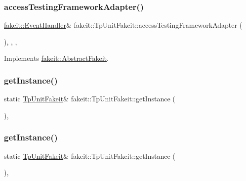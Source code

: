 \subsubsection{\texorpdfstring{accessTestingFrameworkAdapter()}{accessTestingFrameworkAdapter()}\hspace{0.1cm}{\footnotesize\ttfamily [2/2]}}
{\footnotesize\ttfamily \mbox{\hyperlink{structfakeit_1_1EventHandler}{fakeit\+::\+Event\+Handler}}\& fakeit\+::\+Tp\+Unit\+Fakeit\+::access\+Testing\+Framework\+Adapter (\begin{DoxyParamCaption}{ }\end{DoxyParamCaption})\hspace{0.3cm}{\ttfamily [inline]}, {\ttfamily [override]}, {\ttfamily [protected]}, {\ttfamily [virtual]}}



Implements \mbox{\hyperlink{classfakeit_1_1AbstractFakeit_a9476180a503524d49d1978fbbc125b01}{fakeit\+::\+Abstract\+Fakeit}}.

\mbox{\label{classfakeit_1_1TpUnitFakeit_ae92881b2c1b37f04ed19bc3a95e4514f}} 
\subsubsection{\texorpdfstring{getInstance()}{getInstance()}\hspace{0.1cm}{\footnotesize\ttfamily [1/2]}}
{\footnotesize\ttfamily static \mbox{\hyperlink{classfakeit_1_1TpUnitFakeit}{Tp\+Unit\+Fakeit}}\& fakeit\+::\+Tp\+Unit\+Fakeit\+::get\+Instance (\begin{DoxyParamCaption}{ }\end{DoxyParamCaption})\hspace{0.3cm}{\ttfamily [inline]}, {\ttfamily [static]}}

\mbox{\label{classfakeit_1_1TpUnitFakeit_ae92881b2c1b37f04ed19bc3a95e4514f}} 
\subsubsection{\texorpdfstring{getInstance()}{getInstance()}\hspace{0.1cm}{\footnotesize\ttfamily [2/2]}}
{\footnotesize\ttfamily static \mbox{\hyperlink{classfakeit_1_1TpUnitFakeit}{Tp\+Unit\+Fakeit}}\& fakeit\+::\+Tp\+Unit\+Fakeit\+::get\+Instance (\begin{DoxyParamCaption}{ }\end{DoxyParamCaption})\hspace{0.3cm}{\ttfamily [inline]}, {\ttfamily [static]}}



